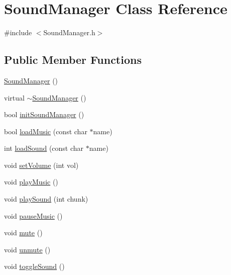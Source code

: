 \hypertarget{classSoundManager}{\section{Sound\-Manager Class Reference}
\label{classSoundManager}
}


{\ttfamily \#include $<$Sound\-Manager.\-h$>$}

\subsection*{Public Member Functions}
\begin{DoxyCompactItemize}
\item 
\hyperlink{classSoundManager_abcc1fbf3488be5788a42c9a4fe56df35}{Sound\-Manager} ()
\item 
virtual \hyperlink{classSoundManager_ad5dbf8eab22db48ff8f3db51b02f8938}{$\sim$\-Sound\-Manager} ()
\item 
bool \hyperlink{classSoundManager_ad1787c39537a0fc19215e7baacf04439}{init\-Sound\-Manager} ()
\item 
bool \hyperlink{classSoundManager_a57caed0509fdbe4710de7b5f7d4de201}{load\-Music} (const char $\ast$name)
\item 
int \hyperlink{classSoundManager_abaa5592584989a7c430b4c0bb74af36b}{load\-Sound} (const char $\ast$name)
\item 
void \hyperlink{classSoundManager_a0ac4dd6921e28b5e3c84fe04d8c21c0b}{set\-Volume} (int vol)
\item 
void \hyperlink{classSoundManager_a6265e3f73b56fea0cab813cd0447d310}{play\-Music} ()
\item 
void \hyperlink{classSoundManager_a77322f5a208b15ba5495c57103b302e5}{play\-Sound} (int chunk)
\item 
void \hyperlink{classSoundManager_a5071bf5e87394afdb1e4148227ffc3ea}{pause\-Music} ()
\item 
void \hyperlink{classSoundManager_ae8afa6738d1e3cb81ed90216574a08f4}{mute} ()
\item 
void \hyperlink{classSoundManager_adb6bd13299469546885f7469680a2699}{unmute} ()
\item 
void \hyperlink{classSoundManager_a316417bb0eb4ee5c84d7ed62cdd08705}{toggle\-Sound} ()
\end{DoxyCompactItemize}

